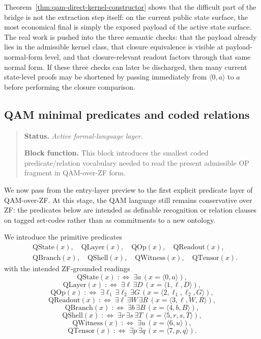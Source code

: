 \begin{remark}\label{rem:qam-direct-kernel-constructor-meaning}
Theorem~\ref{thm:qam-direct-kernel-constructor} shows that the difficult part of the bridge is not the extraction step itself: on the current public state surface, the most economical final is simply the exposed payload of the active state surface. The real work is pushed into the three semantic checks: that the payload already lies in the admissible kernel class, that closure equivalence is visible at payload-normal-form level, and that closure-relevant readout factors through that same normal form. If these three checks can later be discharged, then many current state-level proofs may be shortened by passing immediately from $\langle 0,a\rangle$ to $a$ before performing the closure comparison.
\end{remark}

\subsection*{QAM minimal predicates and coded relations}
\begin{quote}\small
\noindent\textbf{Status.} \emph{Active formal-language layer.}\par
\noindent\textbf{Block function.} This block introduces the smallest coded predicate/relation vocabulary needed to read the present admissible OP fragment in QAM-over-ZF form.
\end{quote}

We now pass from the entry-layer preview to the first explicit predicate layer of QAM-over-ZF. At this stage, the QAM language still remains conservative over ZF: the predicates below are intended as definable recognition or relation clauses on tagged set-codes rather than as commitments to a new ontology.

\begin{definition}
We introduce the primitive predicates
\[
\begin{aligned}
&\mathrm{QState}(x),\quad \mathrm{QLayer}(x),\quad \mathrm{QOp}(x),\quad \mathrm{QReadout}(x),\\[0.15em]
&\mathrm{QBranch}(x),\quad \mathrm{QShell}(x),\quad \mathrm{QWitness}(x),\quad \mathrm{QTensor}(x).
\end{aligned}
\]
with the intended ZF-grounded readings
\[
\mathrm{QState}(x)\;:\Longleftrightarrow\;\exists a\,(x=\langle 0,a\rangle),
\]
\[
\mathrm{QLayer}(x)\;:\Longleftrightarrow\;\exists \ell\,\exists D\,(x=\langle 1,\ell,D\rangle),
\]
\[
\mathrm{QOp}(x)\;:\Longleftrightarrow\;\exists \ell_1\,\exists \ell_2\,\exists G\,(x=\langle 2,\ell_1,\ell_2,G\rangle),
\]
\[
\mathrm{QReadout}(x)\;:\Longleftrightarrow\;\exists \ell\,\exists W\,\exists R\,(x=\langle 3,\ell,W,R\rangle),
\]
\[
\mathrm{QBranch}(x)\;:\Longleftrightarrow\;\exists b\,\exists B\,(x=\langle 4,b,B\rangle),
\]
\[
\mathrm{QShell}(x)\;:\Longleftrightarrow\;\exists r\,\exists s\,\exists T\,(x=\langle 5,r,s,T\rangle),
\]
\[
\mathrm{QWitness}(x)\;:\Longleftrightarrow\;\exists u\,(x=\langle 6,u\rangle),
\]
\[
\mathrm{QTensor}(x)\;:\Longleftrightarrow\;\exists p\,\exists q\,(x=\langle 7,p,q\rangle).
\]
\end{definition}

